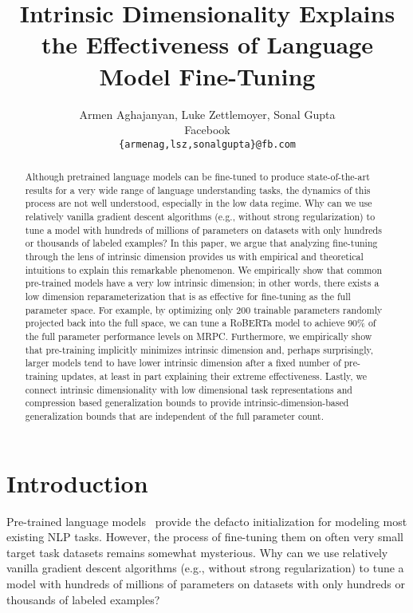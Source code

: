 \documentclass{article} \usepackage{iclr2020_conference,times}
\title{Intrinsic Dimensionality Explains the Effectiveness of Language Model Fine-Tuning}
\author{Armen Aghajanyan, Luke Zettlemoyer, Sonal Gupta \\
Facebook\\
\texttt{\{armenag,lsz,sonalgupta\}@fb.com} \\
}
\begin{document}
\maketitle

\begin{abstract}
Although pretrained language models can be fine-tuned to produce state-of-the-art results for a very wide range of language understanding tasks, the dynamics of this process are not well understood, especially in the low data regime. Why can we use relatively vanilla gradient descent algorithms (e.g., without strong regularization) to tune a model with hundreds of millions of parameters on datasets with only hundreds or thousands of labeled examples? 
In this paper, we argue that analyzing fine-tuning through the lens of intrinsic dimension provides us with empirical and theoretical intuitions to explain this remarkable phenomenon. We empirically show that common pre-trained models have a very low intrinsic dimension; 
in other words, there exists a low dimension reparameterization that is as effective for fine-tuning as the full parameter space.  
For example, by optimizing only 200 trainable parameters randomly projected back into the full space, we can tune a RoBERTa model to achieve 90\% of the full parameter performance levels on MRPC. Furthermore, we empirically show that pre-training implicitly minimizes intrinsic dimension and, perhaps surprisingly, larger models tend to have lower intrinsic dimension after a fixed number of pre-training updates, at least in part explaining their extreme effectiveness. 
Lastly, we connect intrinsic dimensionality with low dimensional task representations and compression based generalization bounds to provide intrinsic-dimension-based generalization bounds that are independent of the full parameter count.
\end{abstract}

\section{Introduction}
Pre-trained language models~\citep{GPT, BERT, ROBERTA, BART,MARGE}  provide the defacto initialization for modeling most existing NLP tasks. However, the process of fine-tuning them on often very small target task datasets remains somewhat mysterious. Why can we use relatively vanilla gradient descent algorithms (e.g., without strong regularization) to tune a model with hundreds of millions of parameters on datasets with only hundreds or thousands of labeled examples?  
\end{document}
